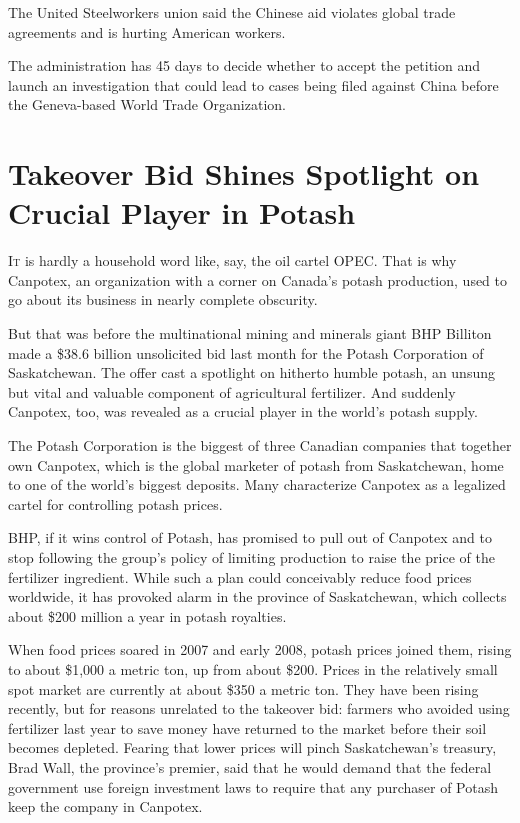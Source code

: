 ﻿\documentclass[12pt]{article}
\begin{document}
The United Steelworkers union said the Chinese aid violates global trade agreements and is hurting
American workers.

The administration has 45 days to decide whether to accept the petition and launch an investigation
that could lead to cases being filed against China before the Geneva-based World Trade Organization.

\pagebreak
\section{Takeover Bid Shines Spotlight on Crucial Player in Potash}

\lettrine{I}{t} is hardly a household word like, say, the oil cartel OPEC.
That is why Canpotex, an organization with a corner on Canada's potash production, used to go about
its business in nearly complete obscurity.

But that was before the multinational mining and minerals giant BHP Billiton made a \$38.6 billion
unsolicited bid last month for the Potash Corporation of Saskatchewan. The offer cast a spotlight on
hitherto humble potash, an unsung but vital and valuable component of agricultural fertilizer. And
suddenly Canpotex, too, was revealed as a crucial player in the world's potash supply.

The Potash Corporation is the biggest of three Canadian companies that together own Canpotex, which
is the global marketer of potash from Saskatchewan, home to one of the world's biggest deposits.
Many characterize Canpotex as a legalized cartel for controlling potash prices.

BHP, if it wins control of Potash, has promised to pull out of Canpotex and to stop following the
group's policy of limiting production to raise the price of the fertilizer ingredient. While such a
plan could conceivably reduce food prices worldwide, it has provoked alarm in the province of
Saskatchewan, which collects about \$200 million a year in potash royalties.

When food prices soared in 2007 and early 2008, potash prices joined them, rising to about \$1,000 a
metric ton, up from about \$200. Prices in the relatively small spot market are currently at about
\$350 a metric ton. They have been rising recently, but for reasons unrelated to the takeover bid:
farmers who avoided using fertilizer last year to save money have returned to the market before
their soil becomes depleted. Fearing that lower prices will pinch Saskatchewan's treasury, Brad
Wall, the province's premier, said that he would demand that the federal government use foreign
investment laws to require that any purchaser of Potash keep the company in Canpotex.
\end{document}
